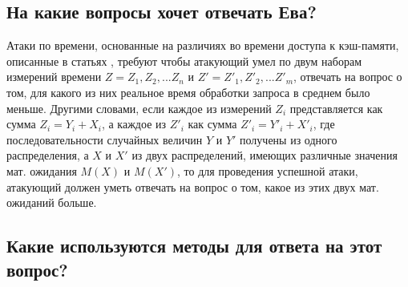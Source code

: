 \subsection{На какие вопросы хочет отвечать Ева?}

Атаки по времени, основанные на различиях во времени доступа к кэш-памяти,
описанные в статьях \cite{bernstein} \cite{anmodel} \cite{remote-aes},
требуют чтобы атакующий умел по двум наборам измерений времени
$Z = {Z_1, Z_2, ... Z_n}$ и $Z' = {Z'_1, Z'_2, ... Z'_m}$, отвечать
на вопрос о том, для какого из них реальное время обработки запроса в среднем
было меньше. Другими словами, если каждое из измерений $Z_i$ представляется как сумма
$Z_i = Y_i + X_i$, а каждое из $Z'_i$ как сумма $Z'_i = Y'_i + X'_i$, где
последовательности случайных величин $Y$ и $Y'$ получены из одного распределения,
а $X$ и $X'$ из двух распределений, имеющих различные значения мат. ожидания
$M(X)$ и $M(X')$, то для проведения успешной атаки, атакующий должен уметь отвечать
на вопрос о том, какое из этих двух мат. ожиданий больше.


\subsection{Какие используются методы для ответа на этот вопрос?}

\clearpage
